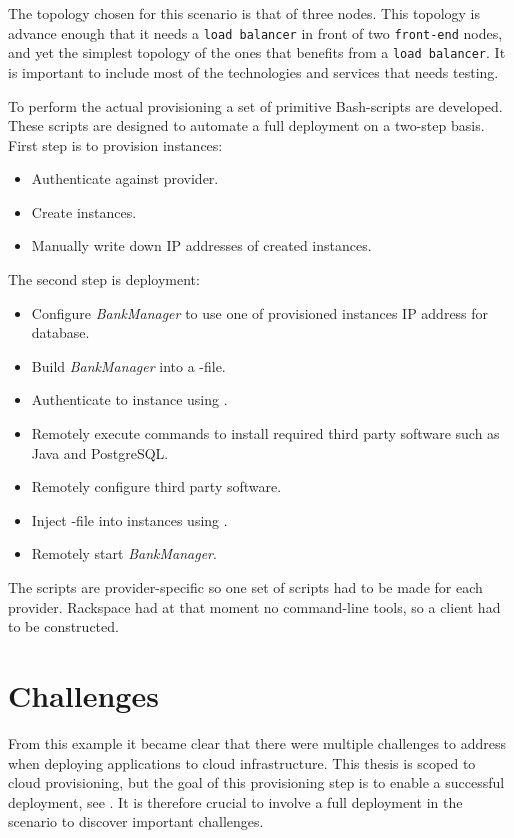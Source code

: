 The topology chosen for this scenario is that of three nodes.
This topology is advance enough that it needs a \texttt{load balancer} in front of two
\texttt{front-end} nodes, and yet the simplest topology of the ones that benefits from a \texttt{load balancer}.
It is important to include most of the technologies and services that needs testing.

To perform the actual provisioning a set of primitive Bash-scripts are developed.
These scripts are designed to automate a full deployment on a two-step basis.
First step is to provision instances:
\begin{itemize}
  \item Authenticate against provider.
  \item Create instances.
  \item Manually write down IP addresses of created instances.
\end{itemize}
The second step is deployment:
\begin{itemize}
  \item Configure \emph{BankManager} to use one of provisioned instances IP address for database.
  \item Build \emph{BankManager} into a -file.
  \item Authenticate to instance using .
  \item Remotely execute commands to install required third party software such as Java and PostgreSQL.
  \item Remotely configure third party software.
  \item Inject -file into instances using .
  \item Remotely start \emph{BankManager}.
\end{itemize}
The scripts are provider-specific so one set of scripts had to be made for each provider.
Rackspace had at that moment no command-line tools, so a  client had to be constructed.

\section{Challenges}

From this example it became clear that there were multiple challenges to address
when deploying applications to cloud infrastructure.
This thesis is scoped to cloud provisioning, but the goal of this provisioning step is to 
enable a successful deployment, see . 
It is therefore crucial to involve a full deployment in the scenario to discover
important challenges.

